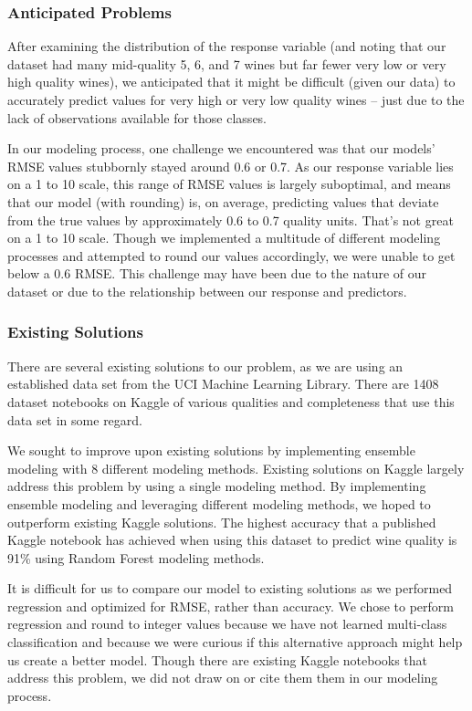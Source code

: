 \documentclass[
  letterpaper,
  DIV=11,
  numbers=noendperiod]{scrartcl}
\begin{document}
\hypertarget{anticipated-problems}{%
\subsubsection{Anticipated Problems}\label{anticipated-problems}}

After examining the distribution of the response variable (and noting
that our dataset had many mid-quality 5, 6, and 7 wines but far fewer
very low or very high quality wines), we anticipated that it might be
difficult (given our data) to accurately predict values for very high or
very low quality wines -- just due to the lack of observations available
for those classes.

In our modeling process, one challenge we encountered was that our
models' RMSE values stubbornly stayed around 0.6 or 0.7. As our response
variable lies on a 1 to 10 scale, this range of RMSE values is largely
suboptimal, and means that our model (with rounding) is, on average,
predicting values that deviate from the true values by approximately 0.6
to 0.7 quality units. That's not great on a 1 to 10 scale. Though we
implemented a multitude of different modeling processes and attempted to
round our values accordingly, we were unable to get below a 0.6 RMSE.
This challenge may have been due to the nature of our dataset or due to
the relationship between our response and predictors.

\hypertarget{existing-solutions}{%
\subsubsection{Existing Solutions}\label{existing-solutions}}

There are several existing solutions to our problem, as we are using an
established data set from the UCI Machine Learning Library. There are
1408 dataset notebooks on Kaggle of various qualities and completeness
that use this data set in some regard.

We sought to improve upon existing solutions by implementing ensemble
modeling with 8 different modeling methods. Existing solutions on Kaggle
largely address this problem by using a single modeling method. By
implementing ensemble modeling and leveraging different modeling
methods, we hoped to outperform existing Kaggle solutions. The highest
accuracy that a published Kaggle notebook has achieved when using this
dataset to predict wine quality is 91\% using Random Forest modeling
methods.

It is difficult for us to compare our model to existing solutions as we
performed regression and optimized for RMSE, rather than accuracy. We
chose to perform regression and round to integer values because we have
not learned multi-class classification and because we were curious if
this alternative approach might help us create a better model. Though
there are existing Kaggle notebooks that address this problem, we did
not draw on or cite them them in our modeling process.
\end{document}
